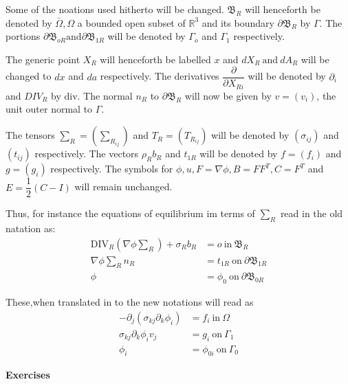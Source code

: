 Some of the noations used hitherto will be changed. $\mathfrak{B} _R$
will henceforth be denoted by $\bar{\Omega}, \Omega$ a bounded open
subset of $\mathbb{R}^3$ and its boundary $\partial \mathfrak{B} _R$
by $\Gamma$. The portions $\partial \mathfrak{B} _{oR} \text {and}
\partial \mathfrak{B}_{1R}$ will be denoted by $\Gamma_o$ and
$\Gamma_1$ respectively. 

The generic point $X_R$ will henceforth be labelled $x$ and $dX_R
~\text{and}~dA_R$ will be changed to $dx$ and $da$ respectively. The
derivatives $\dfrac{\partial}{\partial X_{Ri}}$ will be denoted by
$\partial_i$ and $DIV_R$ by div. The normal $n_R$ to
$\partial\mathfrak{B}_R$ will now be given by $v=(v_i)$, the unit
outer normal to $\Gamma$. 

The tensors $\sum\limits_R = (\sum\limits_{R_{ij}})$ and $T_R =
(T_{R_{ij}})$ will be denoted by $(\sigma_{ij}) $ and $(t_{ij})$
respectively. The vectors $\rho_Rb_R$ and $t_{1R}$ will be denoted by
$f=(f_i)$ and $g = (g_i)$ respectively. The symbols for $\phi , u, F=
\nabla \phi, B= FF^T, C= F^T $ and $E=\dfrac{1}{2} (C-I)$
will remain unchanged. 

Thus, for instance the equations of equilibrium im terms of $\sum_R$
read in the old natation as: 
\begin{align*}
  \text{DIV}_R \left(\nabla\phi \sum_R\right)+\sigma _R b_R & = o
  ~\text{in}~ \mathfrak{B} _R\tag{2.1-9}\label{eq2.1-9}\\  
  \nabla \phi \sum_R n_R &= t_{1R} ~\text{on}~
  \partial\mathfrak{B}_{1R}\tag{2.1-10}\label{eq2.1-10}\\ 
  \phi &=\phi_0 ~\text{on}~ \partial
  \mathfrak{B}_{0R}\tag{2.1-11}\label{eq2.1-11} 
\end{align*}

These,\pageoriginale when translated in to the new notations will read as 
\begin{align*}
  - \partial_j (\sigma_{kj}\partial_k \phi_i)&= f_i ~\text{in}~
  \Omega\tag{2.1-12}\label{eq2.1-12}\\ 
  \sigma_{kj}\partial_{k}\phi_iv_j &= g_i ~\text{on}~
  \Gamma_1\tag{2.1-13}\label{eq2.1-13}\\ 
  \phi_i &=\phi_{0i} ~\text{on}~ \Gamma_0\tag{2.1-14}\label{eq2.1-14}
\end{align*}

\medskip
\begin{center}
{\large\bf Exercises}
\end{center}

